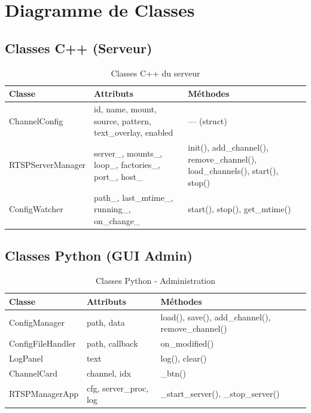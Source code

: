 \documentclass[12pt,a4paper]{report}
\begin{document}
\chapter{Diagramme de Classes}

\section{Classes C++ (Serveur)}

\begin{table}[H]
    \centering
    \caption{Classes C++ du serveur}
    \label{tab:classes_cpp}
    \begin{tabular}{|l|l|l|}
        \hline
        \textbf{Classe} & \textbf{Attributs} & \textbf{Méthodes} \\
        \hline
        ChannelConfig & id, name, mount, source, pattern, text\_overlay, enabled & --- (struct) \\
        \hline
        RTSPServerManager & server\_, mounts\_, loop\_, factories\_, port\_, host\_ & init(), add\_channel(), remove\_channel(), load\_channels(), start(), stop() \\
        \hline
        ConfigWatcher & path\_, last\_mtime\_, running\_, on\_change\_ & start(), stop(), get\_mtime() \\
        \hline
    \end{tabular}
\end{table}

\section{Classes Python (GUI Admin)}

\begin{table}[H]
    \centering
    \caption{Classes Python - Administration}
    \label{tab:classes_python_admin}
    \begin{tabular}{|l|l|l|}
        \hline
        \textbf{Classe} & \textbf{Attributs} & \textbf{Méthodes} \\
        \hline
        ConfigManager & path, data & load(), save(), add\_channel(), remove\_channel() \\
        ConfigFileHandler & path, callback & on\_modified() \\
        LogPanel & text & log(), clear() \\
        ChannelCard & channel, idx & \_btn() \\
        RTSPManagerApp & cfg, server\_proc, log & \_start\_server(), \_stop\_server() \\
        \hline
    \end{tabular}
\end{table}
\end{document}
